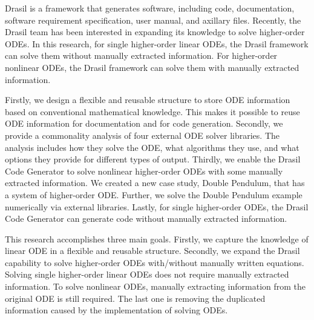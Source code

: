 Drasil is a framework that generates software, including code, documentation, software requirement specification, user manual, and axillary files. Recently, the Drasil team has been interested in expanding its knowledge to solve higher-order ODEs. In this research, for single higher-order linear ODEs, the Drasil framework can solve them without manually extracted information. For higher-order nonlinear ODEs, the Drasil framework can solve them with manually extracted information.

Firstly, we design a flexible and reusable structure to store ODE information based on conventional mathematical knowledge. This makes it possible to reuse ODE information for documentation and for code generation. Secondly, we provide a commonality analysis of four external ODE solver libraries. The analysis includes how they solve the ODE, what algorithms they use, and what options they provide for different types of output. Thirdly, we enable the Drasil Code Generator to solve nonlinear higher-order ODEs with some manually extracted information. We created a new case study, Double Pendulum, that has a system of higher-order ODE. Further, we solve the Double Pendulum example numerically via external libraries. Lastly, for single higher-order ODEs, the Drasil Code Generator can generate code without manually extracted information.

This research accomplishes three main goals. Firstly, we capture the knowledge of linear ODE in a flexible and reusable structure. Secondly, we expand the Drasil capability to solve higher-order ODEs with/without manually written equations. Solving single higher-order linear ODEs does not require manually extracted information. To solve nonlinear ODEs, manually extracting information from the original ODE is still required. The last one is removing the duplicated information caused by the implementation of solving ODEs.